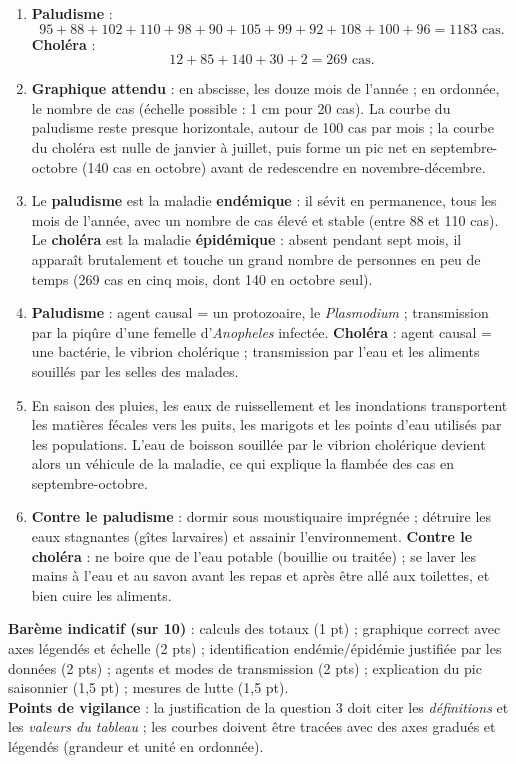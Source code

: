 \documentclass[11pt]{article}
\begin{document}
\begin{corrige}
\begin{enumerate}
\item \textbf{Paludisme} :
\[95+88+102+110+98+90+105+99+92+108+100+96 = \num{1183} \text{ cas.}\]
\textbf{Choléra} :
\[12+85+140+30+2 = 269 \text{ cas.}\]
\item \textbf{Graphique attendu} : en abscisse, les douze mois de l'année ; en ordonnée, le nombre de cas (échelle possible : 1 cm pour 20 cas). La courbe du paludisme reste presque horizontale, autour de 100 cas par mois ; la courbe du choléra est nulle de janvier à juillet, puis forme un pic net en septembre-octobre (140 cas en octobre) avant de redescendre en novembre-décembre.
\item Le \textbf{paludisme} est la maladie \textbf{endémique} : il sévit en permanence, tous les mois de l'année, avec un nombre de cas élevé et stable (entre 88 et 110 cas). Le \textbf{choléra} est la maladie \textbf{épidémique} : absent pendant sept mois, il apparaît brutalement et touche un grand nombre de personnes en peu de temps (269 cas en cinq mois, dont 140 en octobre seul).
\item \textbf{Paludisme} : agent causal = un protozoaire, le \emph{Plasmodium} ; transmission par la piqûre d'une femelle d'\emph{Anopheles} infectée. \textbf{Choléra} : agent causal = une bactérie, le vibrion cholérique ; transmission par l'eau et les aliments souillés par les selles des malades.
\item En saison des pluies, les eaux de ruissellement et les inondations transportent les matières fécales vers les puits, les marigots et les points d'eau utilisés par les populations. L'eau de boisson souillée par le vibrion cholérique devient alors un véhicule de la maladie, ce qui explique la flambée des cas en septembre-octobre.
\item \textbf{Contre le paludisme} : dormir sous moustiquaire imprégnée ; détruire les eaux stagnantes (gîtes larvaires) et assainir l'environnement. \textbf{Contre le choléra} : ne boire que de l'eau potable (bouillie ou traitée) ; se laver les mains à l'eau et au savon avant les repas et après être allé aux toilettes, et bien cuire les aliments.
\end{enumerate}
\textbf{Barème indicatif (sur 10)} : calculs des totaux (1 pt) ; graphique correct avec axes légendés et échelle (2 pts) ; identification endémie/épidémie justifiée par les données (2 pts) ; agents et modes de transmission (2 pts) ; explication du pic saisonnier (1,5 pt) ; mesures de lutte (1,5 pt).\\
\textbf{Points de vigilance} : la justification de la question 3 doit citer les \emph{définitions} et les \emph{valeurs du tableau} ; les courbes doivent être tracées avec des axes gradués et légendés (grandeur et unité en ordonnée).
\end{corrige}
\end{document}
